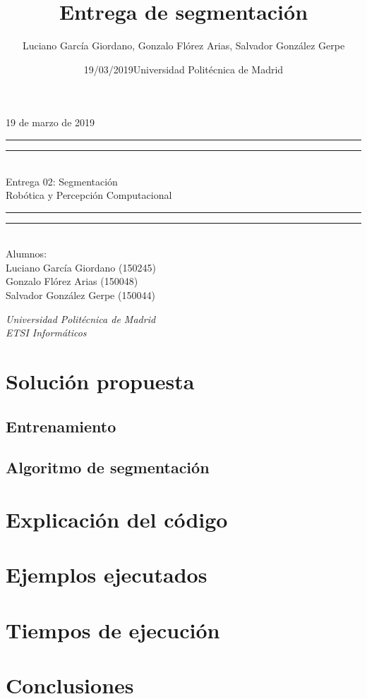 \documentclass{article}
\title{Entrega de segmentación}
\author{Luciano García Giordano, Gonzalo Flórez Arias, Salvador González Gerpe}
\date{19/03/2019}
\date{Universidad Politécnica de Madrid}
\newcommand*{\frontPageEC}[2]{
    \begingroup %
        \centering %
        \vspace*{\baselineskip} %
        {\begin{flushright} \LARGE #1  \end{flushright}}
        \vspace*{\baselineskip}
        \rule{\textwidth}{1.6pt}\vspace*{-\baselineskip}\vspace*{2pt} %
        \rule{\textwidth}{0.4pt}\\[\baselineskip] %
        {\LARGE #2  \\[0.8\baselineskip] \large{Robótica y Percepción Computacional}}\\[0.2\baselineskip] %
        \rule{\textwidth}{0.4pt}\vspace*{-\baselineskip}\vspace{3.2pt} %
        \rule{\textwidth}{1.6pt}\\[\baselineskip] %
        \vspace*{2\baselineskip} %
        Alumnos: \\[\baselineskip]
        {\Large Luciano García Giordano (150245)} \\
        {\Large Gonzalo Flórez Arias (150048)} \\
        {\Large Salvador González Gerpe (150044)} \\
        
        \vfill
        
        {\itshape Universidad Politécnica de Madrid \\ ETSI Informáticos\par} %
    \endgroup}
\begin{document}
\frontPageEC{19 de marzo de 2019}{Entrega 02: Segmentación}
\thispagestyle{empty}

\newpage
\tableofcontents
\setcounter{page}{1}

\clearpage
\newpage



\section{Solución propuesta}

\subsection{Entrenamiento}

\subsection{Algoritmo de segmentación}


\section{Explicación del código}


\section{Ejemplos ejecutados}


\section{Tiempos de ejecución}


\section{Conclusiones}


\begin{thebibliography}{1}

   
\end{thebibliography}
\end{document}
